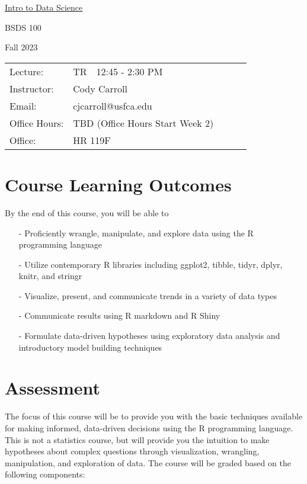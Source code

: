 \documentclass[10pt, oneside]{article}
\begin{document}
	\begin{center} \Large{\underline{Intro to Data Science}} \end{center} 
\begin{center} \Large{BSDS 100} \end{center} 
\begin{center} \Large{Fall 2023} \end{center} 
\begin{table}[ht]
\begin{tabular}{lllll}
 Lecture:&  TR~~12:45  - 2:30  PM		 &   \\ 
 Instructor: & Cody Carroll&  \\
 Email:  & cjcarroll@usfca.edu & \\ 
 Office Hours: & TBD (Office Hours Start Week 2)\\
 Office: &  HR 119F\\ 
\end{tabular}
\end{table}

\thispagestyle{empty}
\section*{Course Learning Outcomes}
By the end of this course, you will be able to

\begin{itemize}
	\item[-] Proficiently wrangle, manipulate, and explore data using the R programming language
	\item[-] Utilize contemporary R libraries including ggplot2, tibble, tidyr, dplyr, knitr, and stringr
	\item[-] Visualize, present, and communicate trends in a variety of data types
	\item[-] Communicate results using R markdown and R Shiny
	\item[-] Formulate data-driven hypotheses using exploratory data analysis and introductory model building techniques
\end{itemize}



\section*{Assessment}
The focus of this course will be to provide you with the basic techniques available for making informed, data-driven decisions using the R programming language. This is not a statistics course, but will provide you the intuition to make hypotheses about complex questions through visualization, wrangling, manipulation, and exploration of data. The course will be graded based on the following components:
\end{document}
